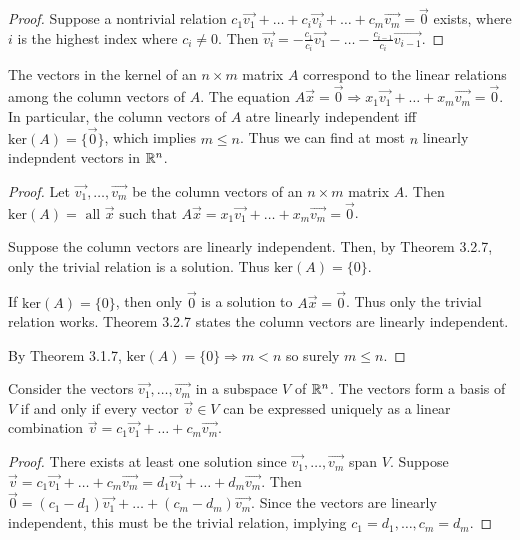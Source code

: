 \documentclass[a4paper,11pt]{article}
\begin{document}
\begin{outline}
\begin{proof}
      \backward
        Suppose a nontrivial relation \(c_1\vec{v_1} + \ldots + c_i\vec{v_i} + \ldots + c_m\vec{v_m} = \vec{0}\)
        exists, where \(i\) is the highest index where \(c_i \neq 0\). Then \(\vec{v_i} = -\frac{c_1}{c_i}\vec{v_1}
        - \ldots - \frac{c_{i-1}}{c_i}\vec{v_{i-1}}\).
    \end{proof}
    
    The vectors in the kernel of an \(n \times m\) matrix \(A\) correspond to the linear relations among the column
    vectors of \(A\). The equation \(A\vec{x} = \vec{0} \Rightarrow x_1\vec{v_1} + \ldots + x_m\vec{v_m} = \vec{0}\).
    In particular, the column vectors of \(A\) atre linearly independent iff \(\text{ker}(A) = \{\vec{0}\}\), which
    implies \(m \leq n\). Thus we can find at most \(n\) linearly indepndent vectors in \(\mathbb{R}^n\).
    
    \begin{proof}
      Let \(\vec{v_1}, \ldots, \vec{v_m}\) be the column vectors of an \(n \times m\) matrix \(A\). Then \(\text{ker}(A)
      = \text{ all } \vec{x} \text{ such that } A\vec{x} = x_1\vec{v_1} + \ldots + x_m\vec{v_m} = \vec{0}\).
      
      \forward
        Suppose the column vectors are linearly independent. Then, by Theorem 3.2.7, only the trivial relation
        is a solution. Thus \(\text{ker}(A) = \{0\}\).
        
      \backward
        If \(\text{ker}(A) = \{0\}\), then only \(\vec{0}\) is a solution to \(A\vec{x} = \vec{0}\). Thus only
        the trivial relation works. Theorem 3.2.7 states the column vectors are linearly independent.
        
      By Theorem 3.1.7, \(\text{ker}(A) = \{0\} \Rightarrow m < n\) so surely \(m \leq n\).
    \end{proof}
    
    Consider the vectors \(\vec{v_1}, \ldots, \vec{v_m}\) in a subspace \(V\) of \(\mathbb{R}^n\). The vectors form
    a basis of \(V\) if and only if every vector \(\vec{v} \in V\) can be expressed uniquely as a linear combination
    \(\vec{v} = c_1\vec{v_1} + \ldots + c_m\vec{v_m}\).
    
    \begin{proof}
      \forward
        There exists at least one solution since \(\vec{v_1}, \ldots, \vec{v_m}\) span \(V\). Suppose \(\vec{v} =
        c_1\vec{v_1} + \ldots + c_m\vec{v_m} = d_1\vec{v_1} + \ldots + d_m\vec{v_m}\). Then \(\vec{0} = (c_1-d_1)\vec{v_1}
        + \ldots + (c_m-d_m)\vec{v_m}\). Since the vectors are linearly independent, this must be the trivial relation, 
        implying \(c_1 = d_1, \ldots, c_m = d_m\).
        

\end{proof}
\end{outline}
\end{document}
